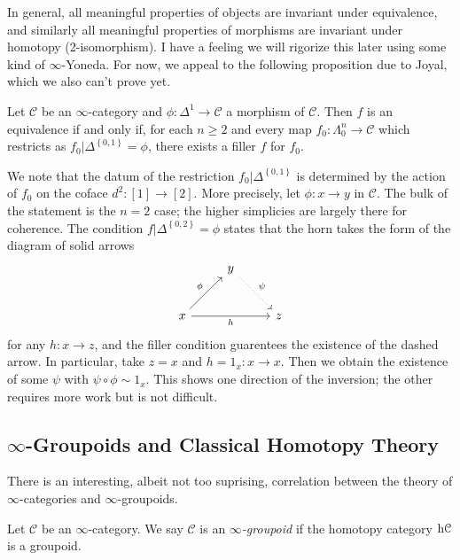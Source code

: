 In general, all meaningful properties of objects are invariant under equivalence, and similarly all meaningful properties of morphisms are invariant under homotopy (2-isomorphism). I have a feeling we will rigorize this later using some kind of $\infty $-Yoneda. For now, we appeal to the following proposition due to Joyal, which we also can't prove yet.

\begin{proposition}\label{1.2.4.3}
	Let $\mathcal{C} $ be an $\infty $-category and $\phi : \Delta ^1 \to \mathcal{C} $ a morphism of $\mathcal{C} $. Then $f$ is an equivalence if and only if, for each $n\geq 2$ and every map $f_0 : \Lambda _0^n \to \mathcal{C} $ which restricts as $f_0|\Delta ^{\left\{ 0,1 \right\} } =\phi$, there exists a filler $f$ for $f_0$.
\end{proposition}

We note that the datum of the restriction $f_0|\Delta ^{\left\{ 0,1 \right\} } $ is determined by the action of $f_0$ on the coface $d^2 : [1] \to [2]$. More precisely, let $\phi : x \to y$ in $\mathcal{C} $. The bulk of the statement is the $n=2$ case; the higher simplicies are largely there for coherence. The condition $f|\Delta ^{\left\{ 0,2 \right\} } =\phi $ states that the horn takes the form of the diagram of solid arrows
\[\begin{tikzcd}[row sep = 2.5em, column sep = 2.5em]
 & y \ar[" \psi  ", dotted, dr]  &  \\
x \ar[" \phi  ", ur] \ar[" h "', rr]  &  & z
\end{tikzcd}\]
for any $h : x \to z$, and the filler condition guarentees the existence of the dashed arrow. In particular, take $z=x$ and $h=1_x : x \to x$. Then we obtain the existence of some $\psi $ with $\psi \circ \phi \sim 1_x$. This shows one direction of the inversion; the other requires more work but is not difficult.


\subsection{$\infty $-Groupoids and Classical Homotopy Theory}

There is an interesting, albeit not too suprising, correlation between the theory of $\infty $-categories and $\infty $-groupoids.

\begin{definition}\label{1.2.5.1}
	Let $\mathcal{C} $ be an $\infty $-category. We say $\mathcal{C} $ is an $\infty $\emph{-groupoid} if the homotopy category $\mathrm{h} \mathcal{C} $ is a groupoid.
\end{definition}

